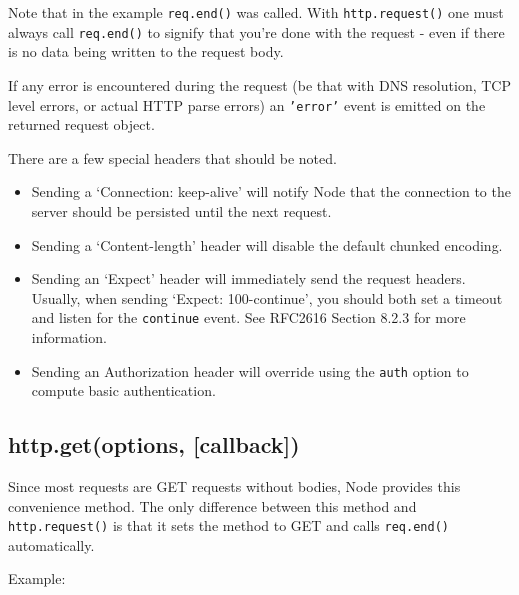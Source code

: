 Note that in the example \texttt{req.end()} was called. With
\texttt{http.request()} one must always call \texttt{req.end()} to
signify that you're done with the request - even if there is no data
being written to the request body.

If any error is encountered during the request (be that with DNS
resolution, TCP level errors, or actual HTTP parse errors) an
\texttt{'error'} event is emitted on the returned request object.

There are a few special headers that should be noted.

\begin{itemize}
\item
  Sending a `Connection: keep-alive' will notify Node that the
  connection to the server should be persisted until the next request.
\item
  Sending a `Content-length' header will disable the default chunked
  encoding.
\item
  Sending an `Expect' header will immediately send the request headers.
  Usually, when sending `Expect: 100-continue', you should both set a
  timeout and listen for the \texttt{continue} event. See RFC2616
  Section 8.2.3 for more information.
\item
  Sending an Authorization header will override using the \texttt{auth}
  option to compute basic authentication.
\end{itemize}

\subsection{http.get(options,
{[}callback{]})}\label{http.getoptions-callback}

Since most requests are GET requests without bodies, Node provides this
convenience method. The only difference between this method and
\texttt{http.request()} is that it sets the method to GET and calls
\texttt{req.end()} automatically.

Example:

\begin{Shaded}
\begin{Highlighting}[]
\NormalTok{(}\NormalTok{, }
  \NormalTok{(} \NormalTok{+ }\NormalTok{);}
\NormalTok{(}\NormalTok{, }
  \NormalTok{(} \NormalTok{+ }\NormalTok{);}
\NormalTok{\});}
\end{Highlighting}
\end{Shaded}

